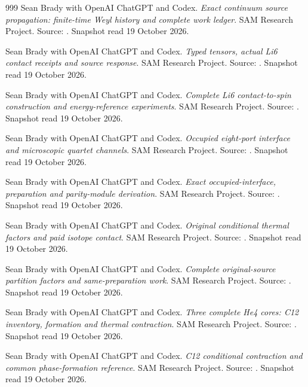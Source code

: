 \begin{thebibliography}{999}
 Sean Brady with OpenAI ChatGPT and Codex. \emph{Exact continuum source propagation: finite-time Weyl history and complete work ledger}. SAM Research Project. Source: . Snapshot read 19 October 2026.

 Sean Brady with OpenAI ChatGPT and Codex. \emph{Typed tensors, actual Li6 contact receipts and source response}. SAM Research Project. Source: . Snapshot read 19 October 2026.

 Sean Brady with OpenAI ChatGPT and Codex. \emph{Complete Li6 contact-to-spin construction and energy-reference experiments}. SAM Research Project. Source: . Snapshot read 19 October 2026.

 Sean Brady with OpenAI ChatGPT and Codex. \emph{Occupied eight-port interface and microscopic quartet channels}. SAM Research Project. Source: . Snapshot read 19 October 2026.

 Sean Brady with OpenAI ChatGPT and Codex. \emph{Exact occupied-interface, preparation and parity-module derivation}. SAM Research Project. Source: . Snapshot read 19 October 2026.

 Sean Brady with OpenAI ChatGPT and Codex. \emph{Original conditional thermal factors and paid isotope contact}. SAM Research Project. Source: . Snapshot read 19 October 2026.

 Sean Brady with OpenAI ChatGPT and Codex. \emph{Complete original-source partition factors and same-preparation work}. SAM Research Project. Source: . Snapshot read 19 October 2026.

 Sean Brady with OpenAI ChatGPT and Codex. \emph{Three complete He4 cores: C12 inventory, formation and thermal contraction}. SAM Research Project. Source: . Snapshot read 19 October 2026.

 Sean Brady with OpenAI ChatGPT and Codex. \emph{C12 conditional contraction and common phase-formation reference}. SAM Research Project. Source: . Snapshot read 19 October 2026.


\end{thebibliography}
